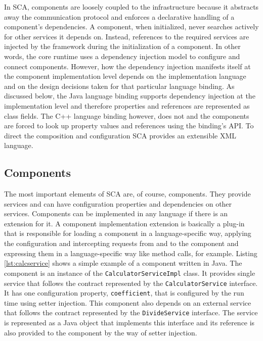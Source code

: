 In SCA, components are loosely coupled to the infrastructure because it abstracts away the communication protocol
and enforces a declarative handling of a component's dependencies. A component, when initialized, never searches
actively for other services it depends on. Instead, references to the required services are injected by the framework
during the initialization of a component. In other words, the core runtime uses a dependency injection model to
configure and connect components. However, how the dependency injection manifests itself at the component implementation
level depends on the implementation language and on the design decisions taken for that particular language binding.
As discussed below, the Java language binding supports dependency injection at the implementation level and therefore
properties and references are represented as class fields. The C++ language binding however, does not and the components
are forced to look up property values and references using the binding's API.
To direct the composition and configuration SCA provides an extensible XML language.

\subsection{Components}

The most important elements of SCA are, of course, components. They provide services and can have configuration properties
and dependencies on other services. Components can be implemented in any language if there is an extension for it. A component
implementation extension is basically a plug-in that is responsible for loading a component in a language-specific way, applying
the configuration and intercepting requests from and to the component and expressing them in a language-specific way like method
calls, for example. Listing \ref{lst:calcservice} shows a simple example of a component written in Java. The component is an instance
of the \texttt{CalculatorServiceImpl} class. It provides single service that follows the contract represented by the \texttt{CalculatorService}
interface. It has one configuration property, \texttt{coefficient}, that is configured by the run time using setter injection.
This component also depends on an external service that follows the contract represented by the \texttt{DivideService} interface.
The service is represented as a Java object that implements this interface and its reference is also provided to the component
by the way of setter injection.

